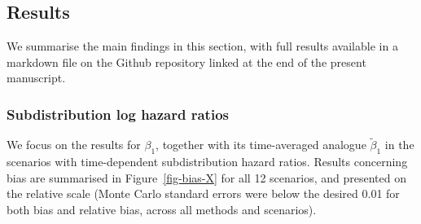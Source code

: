 \documentclass[
  letterpaper,
  DIV=11,
  numbers=noendperiod]{scrreprt}
\begin{document}
\subsection{Results}\label{results-2}

We summarise the main findings in this section, with full results
available in a markdown file on the Github repository linked at the end
of the present manuscript.

\subsubsection{Subdistribution log hazard
ratios}\label{subdistribution-log-hazard-ratios}

We focus on the results for \(\beta_1\), together with its time-averaged
analogue \(\tilde{\beta}_1\) in the scenarios with time-dependent
subdistribution hazard ratios. Results concerning bias are summarised in
Figure~\ref{fig-bias-X} for all 12 scenarios, and presented on the
relative scale (Monte Carlo standard errors were below the desired 0.01
for both bias and relative bias, across all methods and scenarios).
\end{document}
